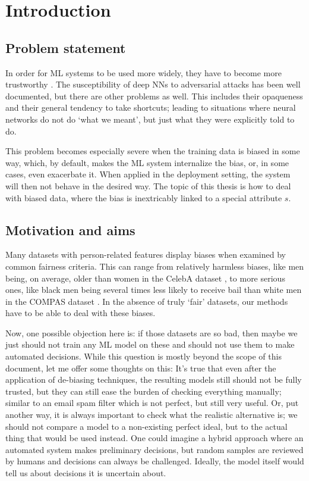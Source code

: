 \chapter{Introduction}\label{ch:introduction}
\section{Problem statement}
In order for \ac{ML} systems to be used more widely,
they have to become more trustworthy \citep{hleg2019ethics}.
The susceptibility of deep \acp{NN} to adversarial attacks has been well documented, but there are other problems as well.
This includes their opaqueness and their general tendency to take shortcuts;
leading to situations where neural networks do not do `what we meant', but just what they were explicitly told to do.

This problem becomes especially severe when the training data is biased in some way,
which, by default, makes the \ac{ML} system internalize the bias, or, in some cases, even exacerbate it.
When applied in the deployment setting, the system will then not behave in the desired way.
The topic of this thesis is how to deal with biased data,
where the bias is inextricably linked to a special attribute $s$.

\section{Motivation and aims}
Many datasets with person-related features display biases when examined by common fairness criteria.
This can range from relatively harmless biases,
like men being, on average, older than women in the CelebA dataset \citep{liu2015faceattributes},
to more serious ones,
like black men being several times less likely to receive bail than white men in the COMPAS dataset \citep{angwin2016machine}.
In the absence of truly `fair' datasets, our methods have to be able to deal with these biases.

Now, one possible objection here is:
if those datasets are so bad,
then maybe we just should not train any \ac{ML} model on these and should not use them to make automated decisions.
While this question is mostly beyond the scope of this document, let me offer some thoughts on this:
It's true that even after the application of de-biasing techniques,
the resulting models still should not be fully trusted,
but they can still ease the burden of checking everything manually;
similar to an email spam filter which is not perfect, but still very useful.
Or, put another way, it is always important to check what the realistic alternative is;
we should not compare a model to a non-existing perfect ideal, but to the actual thing that would be used instead.
One could imagine a hybrid approach where an automated system makes preliminary decisions,
but random samples are reviewed by humans and decisions can always be challenged.
Ideally, the model itself would tell us about decisions it is uncertain about.

